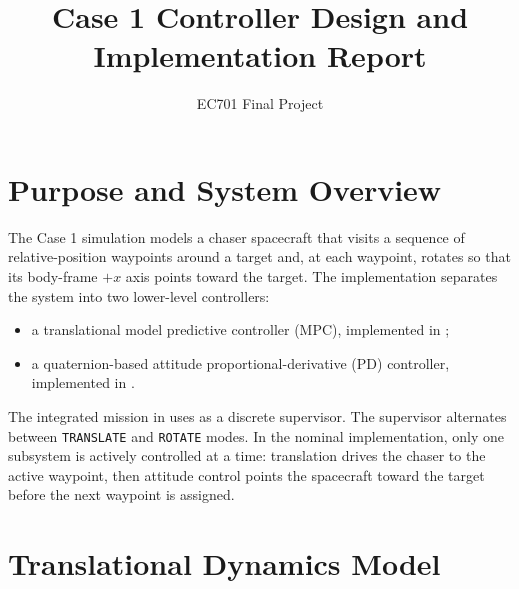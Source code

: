 \documentclass[11pt]{article}
\title{Case 1 Controller Design and Implementation Report}
\author{EC701 Final Project}
\date{}
\begin{document}
\maketitle

\section{Purpose and System Overview}

The Case 1 simulation models a chaser spacecraft that visits a sequence of relative-position waypoints around a target and, at each waypoint, rotates so that its body-frame \(+x\) axis points toward the target. The implementation separates the system into two lower-level controllers:
\begin{itemize}[leftmargin=1.5em]
    \item a translational model predictive controller (MPC), implemented in ;
    \item a quaternion-based attitude proportional-derivative (PD) controller, implemented in .
\end{itemize}

The integrated mission in  uses  as a discrete supervisor. The supervisor alternates between \texttt{TRANSLATE} and \texttt{ROTATE} modes. In the nominal implementation, only one subsystem is actively controlled at a time: translation drives the chaser to the active waypoint, then attitude control points the spacecraft toward the target before the next waypoint is assigned.

\section{Translational Dynamics Model}
\end{document}

